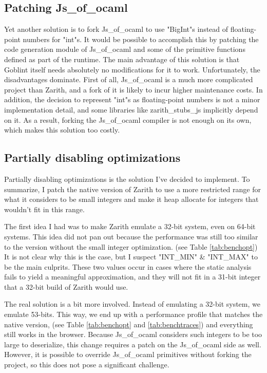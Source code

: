\documentclass{scrartcl}
\begin{document}
\subsection{Patching Js\_of\_ocaml}

Yet another solution is to fork Js\_of\_ocaml to use "BigInt"s instead of floating-point numbers for "int"s. It would be possible to accomplish this by patching the code generation module of Js\_of\_ocaml and some of the primitive functions defined as part of the runtime. The main advantage of this solution is that Goblint itself needs absolutely no modifications for it to work. Unfortunately, the disadvantages dominate. First of all, Js\_of\_ocaml is a much more complicated project than Zarith, and a fork of it is likely to incur higher maintenance costs. In addition, the decision to represent "int"s as floating-point numbers is not a minor implementation detail, and some libraries like zarith\_stubs\_js implicitly depend on it. As a result, forking the Js\_of\_ocaml compiler is not enough on its own, which makes this solution too costly.

\subsection{Partially disabling optimizations}

Partially disabling optimizations is the solution I've decided to implement. To summarize, I patch the native version of Zarith to use a more restricted range for what it considers to be small integers and make it heap allocate for integers that wouldn't fit in this range.

The first idea I had was to make Zarith emulate a 32-bit system, even on 64-bit systems. This idea did not pan out because the performance was still too similar to the version without the small integer optimization. (see Table \ref{tab:benchopt}) It is not clear why this is the case, but I suspect "INT\_MIN" \& "INT\_MAX" to be the main culprits. These two values occur in cases where the static analysis fails to yield a meaningful approximation, and they will not fit in a 31-bit integer that a 32-bit build of Zarith would use.

The real solution is a bit more involved. Instead of emulating a 32-bit system, we emulate 53-bits. This way, we end up with a performance profile that matches the native version, (see Table \ref{tab:benchopt} and \ref{tab:benchtraces}) and everything still works in the browser. Because Js\_of\_ocaml considers such integers to be too large to deserialize, this change requires a patch on the Js\_of\_ocaml side as well. However, it is possible to override Js\_of\_ocaml primitives without forking the project, so this does not pose a significant challenge.
\end{document}
